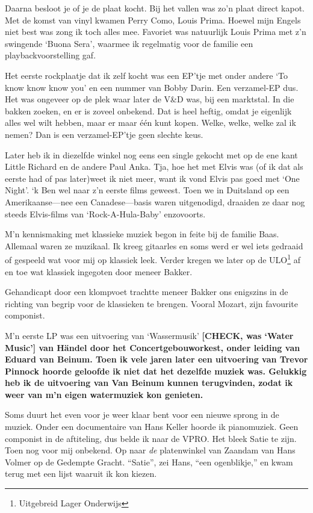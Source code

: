 \documentclass[10pt,twoside,openright]{memoir}
\begin{document}
Daarna besloot je of je de plaat kocht. Bij het vallen was zo’n plaat direct kapot. Met de komst van vinyl kwamen Perry Como, Louis Prima. Hoewel mijn Engels niet best was zong ik toch alles mee. Favoriet was natuurlijk Louis Prima met z’n swingende `Buona Sera', waarmee ik regelmatig voor de familie een playbackvoorstelling gaf.

Het eerste rockplaatje dat ik zelf kocht was een EP'tje met onder andere `To know know know you' en een nummer van Bobby Darin. Een verzamel-EP dus. Het was ongeveer op de plek waar later de V\&D was, bij een marktstal. In die bakken zoeken, en er is zoveel onbekend. Dat is heel heftig, omdat je eigenlijk alles wel wilt hebben, maar er maar één kunt kopen. Welke, welke, welke zal ik nemen? Dan is een verzamel-EP'tje geen slechte keus.

Later heb ik in diezelfde winkel nog eens een single gekocht met op de ene kant Little Richard en de andere Paul Anka. Tja, hoe het met Elvis was (of ik dat als eerste had of pas later)weet ik niet meer, want ik vond Elvis pas goed met `One Night'. `k Ben wel naar z'n eerste films geweest. Toen we in Duitsland op een Amerikaanse---nee een Canadese---basis waren uitgenodigd, draaiden ze daar nog steeds Elvis-films van `Rock-A-Hula-Baby' enzovoorts.

M’n kennismaking met klassieke muziek begon in feite bij de familie Baas. Allemaal waren ze muzikaal. Ik kreeg gitaarles en soms werd er wel iets gedraaid of gespeeld wat voor mij op klassiek leek. Verder kregen we later op de ULO\footnote{Uitgebreid Lager Onderwijs} af en toe wat klassiek ingegoten door meneer Bakker. 

Gehandicapt door een klompvoet trachtte meneer Bakker ons enigszins in de richting van begrip voor de klassieken te brengen. Vooral Mozart, zijn favourite componist.

M’n eerste LP was een uitvoering van ‘Wassermusik’ \bf{[CHECK, was `Water Music']} van Händel door het Concertgebouworkest, onder leiding van Eduard van Beinum. Toen ik vele jaren later een uitvoering van Trevor Pinnock hoorde geloofde ik niet dat het dezelfde muziek was. Gelukkig heb ik de uitvoering van Van Beinum kunnen terugvinden, zodat ik weer van m’n eigen watermuziek kon genieten. 

Soms duurt het even voor je weer klaar bent voor een nieuwe sprong in de muziek. Onder een documentaire van Hans Keller hoorde ik pianomuziek. Geen componist in de aftiteling, dus belde ik naar de VPRO. Het bleek Satie te zijn. Toen nog voor mij onbekend. Op naar \emph{de} platenwinkel van Zaandam van Hans Volmer op de Gedempte Gracht. ``Satie'', zei Hans, ``een ogenblikje,'' en kwam terug met een lijst waaruit ik kon kiezen. 
\end{document}

